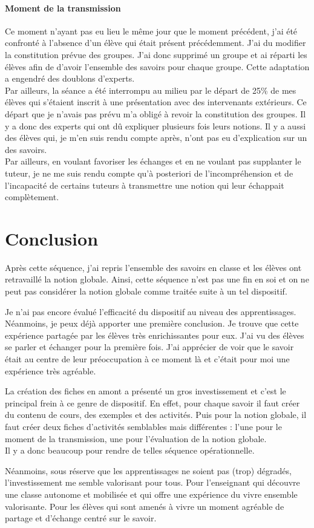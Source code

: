 \paragraph{Moment de la transmission}
%
Ce moment n'ayant pas eu lieu le même jour que le moment précédent, j'ai été confronté à l'absence d'un élève qui était présent précédemment. J'ai du modifier la constitution prévue des groupes. J'ai donc supprimé un groupe et ai réparti les élèves afin de d'avoir l'ensemble des savoirs pour chaque groupe. Cette adaptation a engendré des doublons d'experts.
\\
Par ailleurs, la séance a été interrompu au milieu par le départ de 25\% de mes élèves qui s'étaient inscrit à une présentation avec des intervenants extérieurs. Ce départ que je n'avais pas prévu m'a obligé à revoir la constitution des groupes. Il y a donc des experts qui ont dû expliquer plusieurs fois leurs notions. Il y a aussi des élèves qui, je m'en suis rendu compte après, n'ont pas eu d'explication sur un des savoirs.
\\
Par ailleurs, en voulant favoriser les échanges et en ne voulant pas supplanter le tuteur, je ne me suis rendu compte qu'à posteriori de l'incompréhension et de l'incapacité de certains tuteurs à transmettre une notion qui leur échappait complètement.



\section{Conclusion}



Après cette séquence, j'ai repris l'ensemble des savoirs en classe et les élèves ont retravaillé la notion globale. Ainsi, cette séquence n'est pas une fin en soi et on ne peut pas considérer la notion globale comme traitée suite à un tel dispositif.

Je n'ai pas encore évalué l'efficacité du dispositif au niveau des apprentissages. Néanmoins, je peux déjà apporter une première conclusion. Je trouve que cette expérience partagée par les élèves très enrichissantes pour eux. J'ai vu des élèves se parler et échanger pour la première fois. J'ai apprécier de voir que le savoir était au centre de leur préoccupation à ce moment là et c'était pour moi une expérience très agréable.

La création des fiches en amont a présenté un gros investissement et c'est le principal frein à ce genre de dispositif. En effet, pour chaque savoir il faut créer du contenu de cours, des exemples et des activités. Puis pour la notion globale, il faut créer deux fiches d'activités semblables mais différentes : l'une pour le moment de la transmission, une pour l'évaluation de la notion globale.
\\
Il y a donc beaucoup pour rendre de telles séquence opérationnelle. 

Néanmoins, sous réserve que les apprentissages ne soient pas (trop) dégradés, l'investissement me semble valorisant pour tous. Pour l'enseignant qui découvre une classe autonome et mobilisée et qui offre une expérience du vivre ensemble valorisante. Pour les élèves qui sont amenés à vivre un moment agréable de partage et d'échange centré sur le savoir.